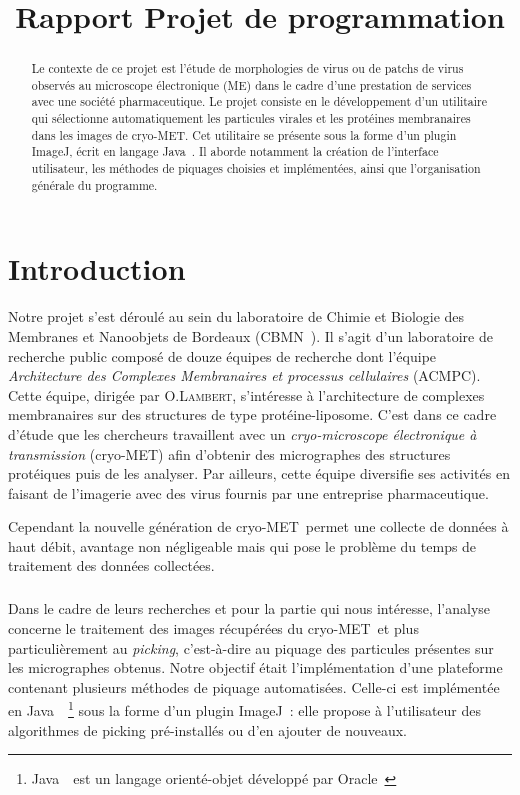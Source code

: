 \documentclass[12pt,a4paper]{report}
\title{Rapport Projet de programmation}
\begin{document}

\newcommand{\cme}{cryo-MET}
\newcommand{\java}{Java~{\tiny \texttrademark}}
\newcommand{\js}{JavaScript}
\newcommand{\imj}{ImageJ}

\begin{abstract}
Le contexte de ce projet est l'étude de morphologies de virus ou de patchs de virus observés au microscope électronique (ME) dans le cadre d'une prestation de services avec une société pharmaceutique. Le projet consiste en le développement d'un utilitaire qui sélectionne automatiquement les particules virales et les protéines membranaires dans les images de \cme. Cet utilitaire se présente sous la forme d'un plugin \imj, écrit en  langage \java.
Il aborde notamment la création de l'interface utilisateur, les méthodes de piquages choisies et implémentées, ainsi que l'organisation générale du programme. 
\end{abstract}

\tableofcontents
\chapter*{Introduction}

Notre projet s'est déroulé au sein du laboratoire de Chimie et Biologie des Membranes et Nanoobjets de Bordeaux (CBMN~\cite{cbmn:url}).
Il s'agit d'un laboratoire de recherche public composé de douze équipes de recherche dont l'équipe \emph{Architecture des Complexes Membranaires et processus cellulaires} (ACMPC). %
Cette équipe, dirigée par O.\textsc{Lambert}, s'intéresse à l'architecture de complexes membranaires sur des structures de type protéine-liposome. C'est dans ce cadre d'étude que les chercheurs travaillent avec un \emph{cryo-microscope électronique à transmission} (\cme) afin d'obtenir des micrographes des structures protéiques puis de les analyser. Par ailleurs, cette équipe diversifie ses activités en faisant de l'imagerie avec des virus fournis par une entreprise pharmaceutique.

\noindent
Cependant la nouvelle génération de \cme ~permet une collecte de données à haut débit, avantage non négligeable mais qui pose le problème du temps de traitement des données collectées. %

\paragraph*{}
Dans le cadre de leurs recherches et pour la partie qui nous intéresse, l'analyse concerne le traitement des images récupérées du \cme\ et plus particulièrement au \emph{picking}, c'est-à-dire au piquage des particules présentes sur les micrographes obtenus. %
Notre objectif était l'implémentation d'une plateforme contenant plusieurs méthodes de piquage automatisées.
Celle-ci est implémentée en \java ~\footnote{\java\ est un langage orienté-objet développé par Oracle~\cite{java:url}} sous la forme d'un plugin \imj~\cite{imagej:url}: elle propose à l'utilisateur des algorithmes de picking pré-installés ou d'en ajouter de nouveaux.
\end{document}
